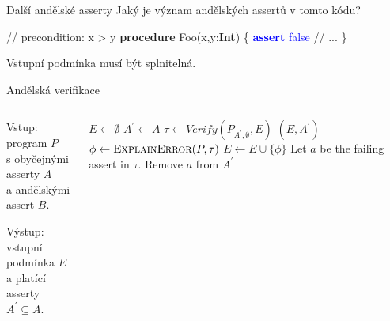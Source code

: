 \documentclass[11pt]{beamer}
\begin{document}
\begin{frame}[fragile]{Další andělské asserty}
Jaký je význam andělských assertů v tomto kódu?
\begin{semiverbatim}
// precondition: x > y
\textbf{procedure} Foo(x,y:\textbf{Int}) \{
  \textcolor{blue}{\textbf{assert} false}
  // ...
\}
\end{semiverbatim}
\pause Vstupní podmínka musí být splnitelná.
\end{frame}

\begin{frame}{Andělská verifikace}
\begin{columns}

\begin{column}{0.4\textwidth}
\pause
Vstup: program $P$\\
s obyčejnými asserty $A$\\
a andělskými assert $B$.\\
\pause


Výstup:  vstupní podmínka $E$ \\
a platící asserty $A^\prime \subseteq A$.
\end{column}

\begin{column}{0.6\textwidth}
\begin{algorithmic} \small
\pause
\State $E \gets \emptyset$
\State $A^\prime \gets A$
\Loop
  \State $\tau \gets \textit{Verify}(P_{A^\prime, \emptyset}, E)$
  	\Return $\left( E, A^\prime \right)$
  \EndIf
  \State $\phi \gets \textsc{ExplainError}(P, \tau)$
    \State $E \gets E \cup \{ \phi \}$
  \Else
  	\State Let $a$ be the failing assert in $\tau$.
  	\State Remove $a$ from $A^\prime$
  \EndIf
\EndLoop
\end{algorithmic}
\end{column}
\end{columns}
\end{frame}
\end{document}
